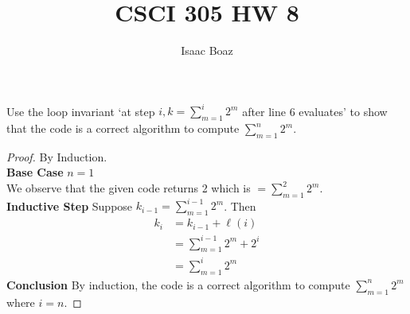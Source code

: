\documentclass{article}
\title{CSCI 305 HW 8}
\author{Isaac Boaz}
\begin{document}
\maketitle

Use the loop invariant `at step \(i, k = \sum_{m=1}^{i}{2^m}\) after line 6 evaluates' to show that the code is a correct algorithm to compute \(\sum_{m=1}^{n}{2^m}\).

\begin{proof}
      By Induction. \\
      \textbf{Base Case} \(n = 1\) \\
      We observe that the given code returns 2 which is \(= \sum_{m=1}^{2} 2^m\). \\[1em]
      \textbf{Inductive Step} Suppose \(k_{i-1} = \sum_{m=1}^{i-1}{2^m}\). Then
      \begin{align*}
            k_{i} & = k_{i-1} + \ell(i)           \\
                  & = \sum_{m=1}^{i-1}{2^m} + 2^i \\
                  & = \sum_{m=1}^{i}{2^m}
      \end{align*}
      \textbf{Conclusion} By induction, the code is a correct algorithm to compute \(\sum_{m=1}^{n}{2^m}\) where \(i = n\).
\end{proof}
\end{document}
